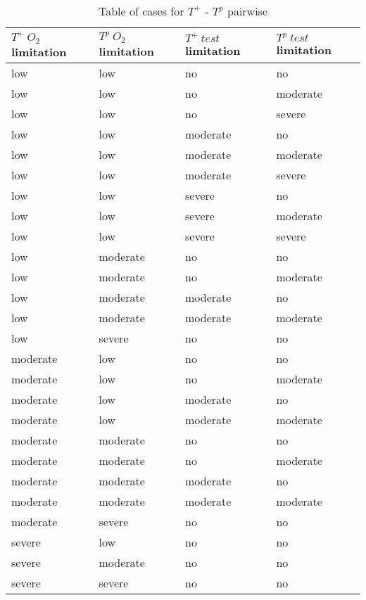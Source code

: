 \begin{table}
  \centering
  \begin{tabular}{|l|l|l|l|}
    \hline
    \textbf{$T^+\ O_2$ limitation} & \textbf{$T^p\ O_2$ limitation} & \textbf{$T^+\ test$ limitation} & \textbf{$T^p\ test$ limitation}  \\ \hline
    low & low & no & no \\ \hline
    low & low & no & moderate \\ \hline
    low & low & no & severe \\ \hline
    low & low & moderate & no \\ \hline
    low & low & moderate & moderate \\ \hline
    low & low & moderate & severe \\ \hline
    low & low & severe & no \\ \hline
    low & low & severe & moderate \\ \hline
    low & low & severe & severe \\ \hline
    low & moderate & no & no \\ \hline
    low & moderate & no & moderate \\ \hline
    low & moderate & moderate & no \\ \hline
    low & moderate & moderate & moderate \\ \hline
    low & severe & no & no \\ \hline
    moderate & low & no & no \\ \hline
    moderate & low & no & moderate \\ \hline
    moderate & low & moderate & no \\ \hline
    moderate & low & moderate & moderate \\ \hline
    moderate & moderate & no & no \\ \hline
    moderate & moderate & no & moderate \\ \hline
    moderate & moderate & moderate & no \\ \hline
    moderate & moderate & moderate & moderate \\ \hline
    moderate & severe & no & no \\ \hline
    severe & low & no & no \\ \hline
    severe & moderate & no & no \\ \hline
    severe & severe & no & no \\ \hline
  \end{tabular}
  \caption{Table of cases for $T^+$ - $T^p$ pairwise}
  \label{tab_Tpos-Tpro_cases}
\end{table}

